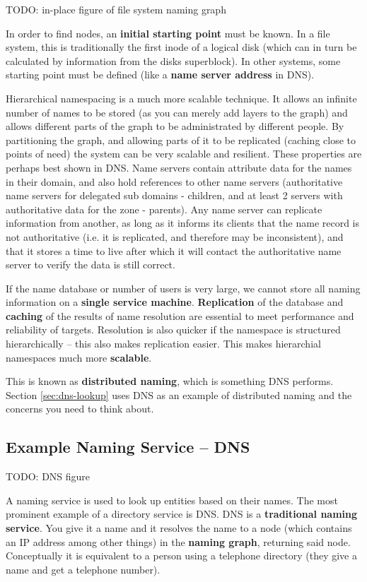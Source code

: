 \documentclass{article}
\begin{document}
TODO: in-place figure of file system naming graph

In order to find nodes, an \textbf{initial starting point} must be known. In a file system, this is traditionally the first inode of a logical disk (which can in turn be calculated by information from the disks superblock). In other systems, some starting point must be defined (like a \textbf{name server address} in DNS).

Hierarchical namespacing is a much more scalable technique. It allows an infinite number of names to be stored (as you can merely add layers to the graph) and allows different parts of the graph to be administrated by different people. By partitioning the graph, and allowing parts of it to be replicated (caching close to points of need) the system can be very scalable and resilient. These properties are perhaps best shown in DNS. Name servers contain attribute data for the names in their domain, and also hold references to other name servers (authoritative name servers for delegated sub domains - children, and at least 2 servers with authoritative data for the zone - parents). Any name server can replicate information from another, as long as it informs its clients that the name record is not authoritative (i.e. it is replicated, and therefore may be inconsistent), and that it stores a time to live after which it will contact the authoritative name server to verify the data is still correct. 

If the name database or number of users is very large, we cannot store all naming information on a \textbf{single service machine}. \textbf{Replication} of the database and \textbf{caching} of the results of name resolution are essential to meet performance and reliability of targets. Resolution is also quicker if the namespace is structured hierarchically -- this also makes replication easier. This makes hierarchial namespaces much more \textbf{scalable}.

This is known as \textbf{distributed naming}, which is something DNS performs. Section \ref{sec:dns-lookup} uses DNS as an example of distributed naming and the concerns you need to think about.

\subsection{Example Naming Service -- DNS}

TODO: DNS figure

A naming service is used to look up entities based on their names. The most prominent example of a directory service is DNS. DNS is a \textbf{traditional naming service}. You give it a name and it resolves the name to a node (which contains an IP address among other things) in the \textbf{naming graph}, returning said node. Conceptually it is equivalent to a person using a telephone directory (they give a name and get a telephone number).
\end{document}
